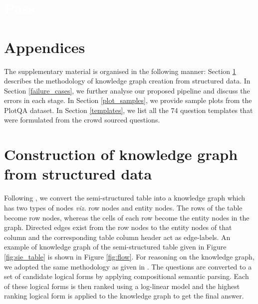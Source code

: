 \documentclass[10pt,twocolumn,letterpaper]{article}
\begin{document}

\section*{\textcolor{white}{Pass}}
\newpage
\section*{Appendices}
The supplementary material is organised in the following manner:
Section \ref{kg_creation} describes the methodology of knowledge graph creation from structured data.
In Section \ref{failure_cases}, we further analyse our proposed pipeline and discuss the errors in each stage.
In Section \ref{plot_samples}, we provide sample plots from the PlotQA dataset.
In Section \ref{templates}, we list all the 74 question templates that were formulated from the crowd sourced questions.
\section{Construction of knowledge graph from structured data} \label{kg_creation} 
Following \cite{PasupatL15}, we convert the semi-structured table into a knowledge graph which has two types of nodes \textit{viz.} row nodes and entity nodes. The rows of the table become row nodes, whereas the cells of each row become the entity nodes in the graph. Directed edges exist from the row nodes to the entity nodes of that column and the corresponding table column header act as edge-labels. An example of knowledge graph of the semi-structured table given in Figure \ref{fig:sie_table} is shown in Figure \ref{fig:flow}. For reasoning on the knowledge graph, we adopted the same methodology as given in \cite{PasupatL15}. The questions are converted to a set of candidate logical forms by applying compositional semantic parsing. Each of these logical forms is then ranked using a log-linear model and the highest ranking logical form is applied to the knowledge graph to get the final answer. 
\end{document}
